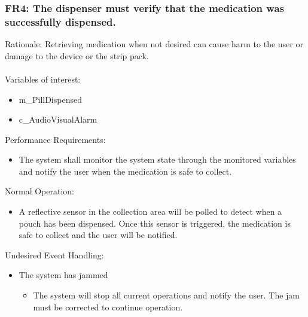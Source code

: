 \documentclass[12pt]{article}
\begin{document}
\subsubsection*{FR4: The dispenser must verify that the medication was successfully dispensed.}
Rationale: Retrieving medication when not desired can cause harm to the user or damage to the device or the strip pack.
\\\\
Variables of interest: 
\begin{itemize}[noitemsep,topsep=0pt]
    \item m\_PillDispensed
    \item c\_AudioVisualAlarm
\end{itemize} 
\bigskip
Performance Requirements:
\begin{itemize}[noitemsep,topsep=0pt]
    \item The system shall monitor the system state through the monitored variables and notify the user when the medication is safe to collect.
\end{itemize}
\bigskip
Normal Operation:
\begin{itemize}[noitemsep,topsep=0pt]
    \item A reflective sensor in the collection area will be polled to detect when a pouch has been dispensed. Once this sensor is triggered, the medication is safe to collect and the user will be notified.
\end{itemize}
\bigskip
Undesired Event Handling:
\begin{itemize}[noitemsep,topsep=0pt]
    \item The system has jammed
    \begin{itemize}
        \item The system will stop all current operations and notify the user. The jam must be corrected to continue operation.
    \end{itemize}
\end{itemize}
\bigskip

\end{document}
